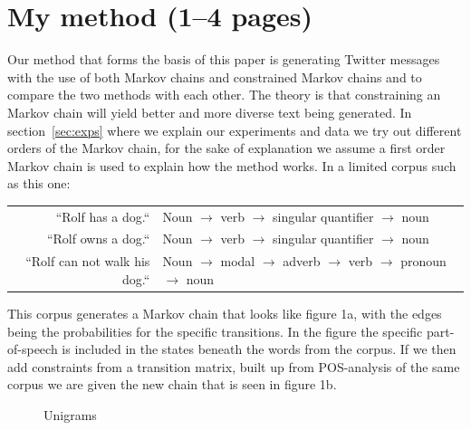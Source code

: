 \documentclass[a4paper,12pt]{article}
\begin{document}
\newpage

\section{My method (1--4 pages)}
\label{sec:method}
Our method that forms the basis of this paper is generating Twitter messages with the use of both Markov chains and constrained Markov chains and to compare the two methods with each other.
The theory is that constraining an Markov chain will yield better and more diverse text being generated. 
In section~\ref{sec:exps} where we explain our experiments and data we try out different orders of the Markov chain, 
for the sake of explanation we assume a first order Markov chain is used to explain how the method works. 
In a limited corpus such as this one: \\

\begin{tabular}{r | l}
``Rolf has a dog.`` & Noun $\to$ verb $\to$ singular quantifier $\to$ noun \\
``Rolf owns a dog.`` & Noun $\to$ verb $\to$ singular quantifier $\to$ noun \\
``Rolf can not walk his dog.`` & Noun $\to$ modal $\to$ adverb $\to$ verb $\to$ pronoun $\to$ noun \\
\end{tabular}

This corpus generates a Markov chain that looks like figure 1a, with the edges being the probabilities for the specific transitions. 
In the figure the specific part-of-speech is included in the states beneath the words from the corpus. 
If we then add constraints from a transition matrix, built up from POS-analysis of the same corpus we are given the new chain that is seen in figure 1b.

\begin{figure}[h!]
  \hfill
  \hfill
  \hfill
  \caption{Unigrams}
 \end{figure}
\end{document}
